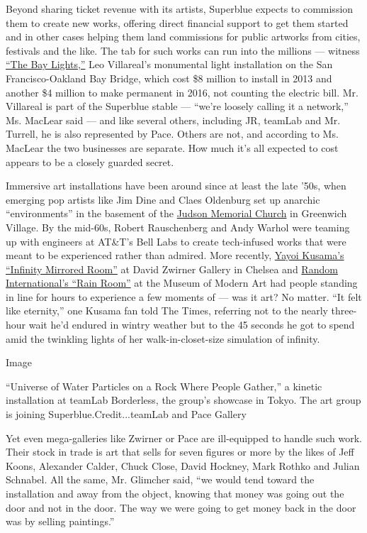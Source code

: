 Beyond sharing ticket revenue with its artists, Superblue expects to
commission them to create new works, offering direct financial support
to get them started and in other cases helping them land commissions for
public artworks from cities, festivals and the like. The tab for such
works can run into the millions --- witness
\href{https://illuminate.org/projects/the-bay-lights/}{``The Bay
Lights,''} Leo Villareal's monumental light installation on the San
Francisco-Oakland Bay Bridge, which cost \$8 million to install in 2013
and another \$4 million to make permanent in 2016, not counting the
electric bill. Mr. Villareal is part of the Superblue stable --- ``we're
loosely calling it a network,'' Ms. MacLear said --- and like several
others, including JR, teamLab and Mr. Turrell, he is also represented by
Pace. Others are not, and according to Ms. MacLear the two businesses
are separate. How much it's all expected to cost appears to be a closely
guarded secret.

Immersive art installations have been around since at least the late
'50s, when emerging pop artists like Jim Dine and Claes Oldenburg set up
anarchic ``environments'' in the basement of the
\href{https://www.judson.org/arts}{Judson Memorial Church} in Greenwich
Village. By the mid-60s, Robert Rauschenberg and Andy Warhol were
teaming up with engineers at AT\&T's Bell Labs to create tech-infused
works that were meant to be experienced rather than admired. More
recently,
\href{https://www.nytimes3xbfgragh.onion/2013/12/02/arts/design/yayoi-kusamas-mirrored-room-at-david-zwirner-gallery.html}{Yayoi
Kusama's ``Infinity Mirrored Room''} at David Zwirner Gallery in Chelsea
and
\href{https://www.nytimes3xbfgragh.onion/video/arts/design/100000002254021/rain-room-at-the-barbican-center.html}{Random
International's ``Rain Room''} at the Museum of Modern Art had people
standing in line for hours to experience a few moments of --- was it
art? No matter. ``It felt like eternity,'' one Kusama fan told The
Times, referring not to the nearly three-hour wait he'd endured in
wintry weather but to the 45 seconds he got to spend amid the twinkling
lights of her walk-in-closet-size simulation of infinity.

Image

``Universe of Water Particles on a Rock Where People Gather,'' a kinetic
installation at teamLab Borderless, the group's showcase in Tokyo. The
art group is joining Superblue.Credit...teamLab and Pace Gallery

Yet even mega-galleries like Zwirner or Pace are ill-equipped to handle
such work. Their stock in trade is art that sells for seven figures or
more by the likes of Jeff Koons, Alexander Calder, Chuck Close, David
Hockney, Mark Rothko and Julian Schnabel. All the same, Mr. Glimcher
said, ``we would tend toward the installation and away from the object,
knowing that money was going out the door and not in the door. The way
we were going to get money back in the door was by selling paintings.''

